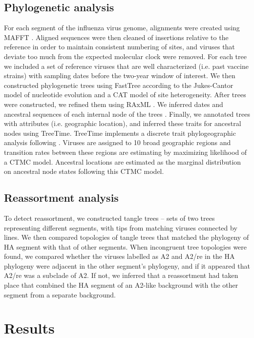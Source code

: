 \subsection*{Phylogenetic analysis}
For each segment of the influenza virus genome, alignments were created using MAFFT \citep{katoh_mafft_2013}.
Aligned sequences were then cleaned of insertions relative to the reference in order to maintain consistent numbering of sites, and viruses that deviate too much from the expected molecular clock were removed.
For each tree we included a set of reference viruses that are well characterized (i.e. past vaccine strains) with sampling dates before the two-year window of interest.
We then constructed phylogenetic trees using FastTree \citep{price_fasttree_2009} according to the Jukes-Cantor model of nucleotide evolution and a CAT model of site heterogeneity.
After trees were constructed, we refined them using RAxML \citep{stamatakis_raxml_2014}.
We inferred dates and ancestral sequences of each internal node of the trees \citep{Sagulenko2018}.
Finally, we annotated trees with attributes (i.e. geographic location), and inferred these traits for ancestral nodes using TreeTime.
TreeTime \citep{TreeTime} implements a discrete trait phylogeographic analysis following \citep{Lemey2009Bayesian}.
Viruses are assigned to 10 broad geographic regions and transition rates between these regions are estimating by maximizing likelihood of a CTMC model.
Ancestral locations are estimated as the marginal distribution on ancestral node states following this CTMC model.

\subsection*{Reassortment analysis}
To detect reassortment, we constructed tangle trees -- sets of two trees representing different segments, with tips from matching viruses connected by lines.
We then compared topologies of tangle trees that matched the phylogeny of HA segment with that of other segments.
When incongruent tree topologies were found, we compared whether the viruses labelled as A2 and A2/re in the HA phylogeny were adjacent in the other segment's phylogeny, and if it appeared that A2/re was a subclade of A2.
If not, we inferred that a reassortment had taken place that combined the HA segment of an A2-like background with the other segment from a separate background.

\section*{Results}
